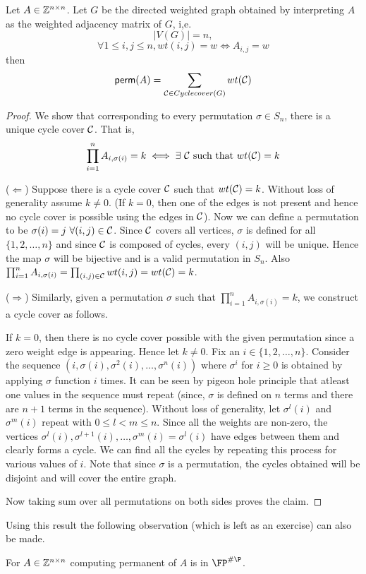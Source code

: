 \begin{lemma}
Let $A \in {\mathbb{Z}}^{n \times n}$. Let $G$ be the directed weighted graph obtained
by interpreting $A$ as the weighted adjacency matrix of $G$, i,e. 
\[|V(G)| = n,\] \[ \forall 1 \le i,j \le n, wt(i, j) = w \iff A_{i,j} = w \]
then
\[ {\sf perm}(A) = \sum_{\substack{{\cal C} \in Cyclecover(G)}} wt({\cal C}) \]
\end{lemma}
\begin{proof}
We show that corresponding to every permutation $\sigma \in S_n$, there is a
unique cycle cover ${\cal C}$. That is,
\[ \prod_{\substack{i=1}}^n A_{i,\sigma(i)} = k \iff \exists~{\cal C} \text{ such
that } wt({\cal C}) = k \]

($\Leftarrow$) Suppose there is a cycle cover ${\cal C}$ such 
that $wt({\cal C}) = k$. Without loss of generality assume $k \not = 0$. 
(If $k=0$, then one of the edges is not  present and hence no cycle cover is 
possible using the edges in ${\cal C}$).  
Now we can define a permutation to be $\sigma(i) = j~\forall (i,j)\in {\cal C}$.
Since ${\cal C}$ covers all vertices, $\sigma$ is defined for all $\{1,2,\ldots,
n\}$ and since ${\cal C}$ is composed of cycles, every $(i,j)$ will be unique.
Hence the map $\sigma$ will be bijective and is a valid permutation in $S_n$.
Also $\prod_{i=1}^n A_{i,\sigma(i)} = \prod_{(i,j) \in {\cal C}} wt(i,j) =
wt({\cal C}) = k$.

($\Rightarrow$) Similarly, given a permutation $\sigma$ such that $\prod_{i=1}^n
A_{i,\sigma(i)} = k$, we construct a cycle cover as follows.

If $k=0$, then there is no cycle cover possible with the given permutation
since a zero weight edge is appearing. Hence let $k \not = 0$. Fix an $i\in
\{1,2,\ldots,n\}$. Consider the sequence $(i, \sigma(i), \sigma^2(i), \ldots,
\sigma^n(i))$ where $\sigma^i$ for $i \ge 0$ is obtained by applying $\sigma$
function $i$ times. It can be seen by pigeon hole principle that atleast one
values in the sequence must repeat (since, $\sigma$ is defined on $n$ 
terms and there are $n+1$ terms in the sequence). Without loss of generality, 
let $\sigma^l(i)$ and $\sigma^m(i)$ repeat with $ 0 \le l < m \le n$. 
Since all the weights  are non-zero, the vertices 
$\sigma^l(i), \sigma^{l+1}(i), \ldots, \sigma^m(i) = \sigma^l(i)$ have 
edges between them and clearly forms a cycle. We can find
all the cycles by repeating this process for various values of $i$. 
Note that since $\sigma$ is a permutation, the cycles obtained will be disjoint 
and will cover the entire graph.

Now taking sum over all permutations on both sides proves the claim.
\end{proof}

Using this result the following observation (which is left as an exercise) can
also be made.
\begin{observation}
For $A \in {\mathbb{Z}}^{n\times n}$ computing permanent of $A$ is in $\FP^{\#\P}$.
\end{observation}
